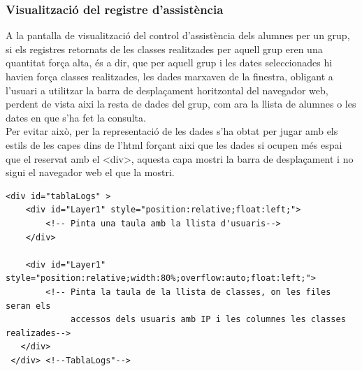 \documentclass[a4paper]{report}  %
\begin{document}
\subsubsection{Visualització del registre d'assistència}
A la pantalla de visualització del control d'assistència dels alumnes per un grup, si els registres retornats de les classes realitzades per aquell grup eren una quantitat força alta, és a dir, que per aquell grup i les dates seleccionades hi havien força classes realitzades, les dades marxaven de la finestra, obligant a l'usuari a utilitzar la barra de desplaçament horitzontal del navegador web, perdent de vista aixi la resta de dades del grup, com ara la llista de alumnes o les dates en que s'ha fet la consulta.\\
Per evitar això, per la representació de les dades s'ha obtat per jugar amb els estils de les capes dins de l'html forçant aixi que les dades si ocupen més espai que el reservat amb el <div>, aquesta capa mostri la barra de desplaçament i no sigui el navegador web el que la mostri.
\begin{lstlisting}[style=HTML, caption=codi de readgroup.html\, on es juga amb els estils de les capes per mostrar la barra de desplaçament horitzontal.]
 <div id="tablaLogs" >
 	<div id="Layer1" style="position:relative;float:left;">
 		<!-- Pinta una taula amb la llista d'usuaris-->
	</div>

	<div id="Layer1" style="position:relative;width:80%;overflow:auto;float:left;">
		<!-- Pinta la taula de la llista de classes, on les files seran els
			 accessos dels usuaris amb IP i les columnes les classes realizades--> 
   </div>
 </div> <!--TablaLogs"-->

\end{lstlisting}
\end{document}
